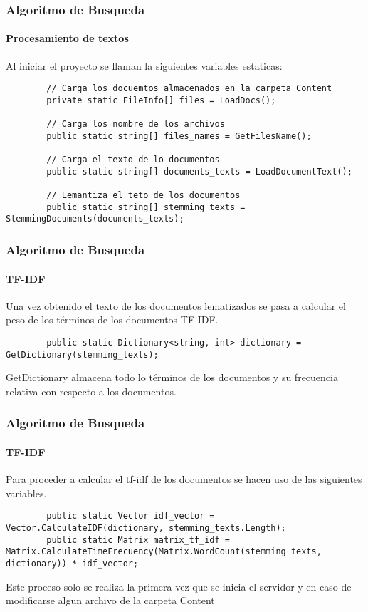 \documentclass[12pt]{beamer}
\begin{document}
	\begin{frame}[fragile]
		\frametitle{Algoritmo de Busqueda}
		\framesubtitle{Procesamiento de textos}
		
		Al iniciar el proyecto se llaman la siguientes variables estaticas:
		
		\begin{lstlisting}
		// Carga los docuemtos almacenados en la carpeta Content
		private static FileInfo[] files = LoadDocs();
		
		// Carga los nombre de los archivos
		public static string[] files_names = GetFilesName();
		
		// Carga el texto de lo documentos
		public static string[] documents_texts = LoadDocumentText();
					
		// Lemantiza el teto de los documentos
		public static string[] stemming_texts = StemmingDocuments(documents_texts);
		\end{lstlisting}
	\end{frame}
	
	\begin{frame}[fragile]
		\frametitle{Algoritmo de Busqueda}
		\framesubtitle{TF-IDF}
			
		Una vez obtenido el texto de los documentos lematizados se pasa a calcular el peso de los términos de los documentos TF-IDF.
			
		\begin{lstlisting}
		public static Dictionary<string, int> dictionary = GetDictionary(stemming_texts);
		\end{lstlisting}
		
		GetDictionary almacena todo lo términos de los documentos y su frecuencia relativa con respecto a los documentos.
	\end{frame}
	
	\begin{frame}[fragile]
		\frametitle{Algoritmo de Busqueda}
		\framesubtitle{TF-IDF}
		
		Para proceder a calcular el tf-idf de los documentos se hacen uso de las siguientes variables.
		
		\begin{lstlisting}
		public static Vector idf_vector = Vector.CalculateIDF(dictionary, stemming_texts.Length);
		public static Matrix matrix_tf_idf = Matrix.CalculateTimeFrecuency(Matrix.WordCount(stemming_texts, dictionary)) * idf_vector;
		\end{lstlisting}
		
		Este proceso solo se realiza la primera vez que se inicia el servidor y en caso de modificarse algun archivo de la carpeta Content
	\end{frame}
	
\end{document}
